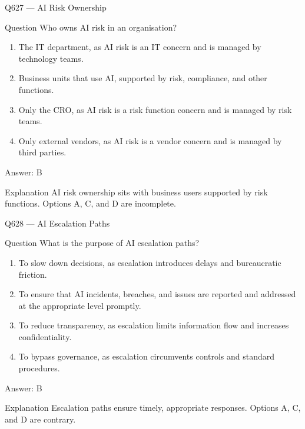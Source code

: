 \documentclass[aspectratio=169,8pt]{beamer}
\begin{document}
	\begin{frame}{Q627 --- AI Risk Ownership}
		\begin{block}{Question}
			Who owns AI risk in an organisation?
			\begin{enumerate}
				\item The IT department, as AI risk is an IT concern and is managed by technology teams.
				\item Business units that use AI, supported by risk, compliance, and other functions.
				\item Only the CRO, as AI risk is a risk function concern and is managed by risk teams.
				\item Only external vendors, as AI risk is a vendor concern and is managed by third parties.
			\end{enumerate}
		\end{block}
		\begin{exampleblock}{Answer: B}\end{exampleblock}
		\begin{block}{Explanation}
			AI risk ownership sits with business users supported by risk functions. Options A, C, and D are incomplete.
		\end{block}
	\end{frame}
	
	\begin{frame}{Q628 --- AI Escalation Paths}
		\begin{block}{Question}
			What is the purpose of AI escalation paths?
			\begin{enumerate}
				\item To slow down decisions, as escalation introduces delays and bureaucratic friction.
				\item To ensure that AI incidents, breaches, and issues are reported and addressed at the appropriate level promptly.
				\item To reduce transparency, as escalation limits information flow and increases confidentiality.
				\item To bypass governance, as escalation circumvents controls and standard procedures.
			\end{enumerate}
		\end{block}
		\begin{exampleblock}{Answer: B}\end{exampleblock}
		\begin{block}{Explanation}
			Escalation paths ensure timely, appropriate responses. Options A, C, and D are contrary.
		\end{block}
	\end{frame}
	
\end{document}
